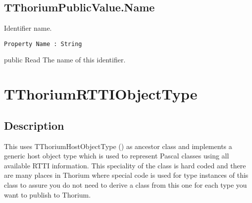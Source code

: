 \subsection{TThoriumPublicValue.Name}
\label{thoriumcorepkg:thorium:tthoriumpublicvalue:name}
\begin{FPCList}
\Synopsis
Identifier name.\Declaration 

\begin{verbatim}
Property Name : String
\end{verbatim}
\Visibility
public
\Access
Read
\Description
The name of this identifier.\end{FPCList}
\section{TThoriumRTTIObjectType}
\label{thoriumcorepkg:thorium:tthoriumrttiobjecttype}
\subsection{Description}
This uses TThoriumHostObjectType (\pageref{thoriumcorepkg:thorium:tthoriumhostobjecttype}) as ancestor class and implements a generic host object type which is used to represent Pascal classes using all available RTTI information. This speciality of the class is hard coded and there are many places in Thorium where special code is used for type instances of this class to assure you do not need to derive a class from this one for each type you want to publish to Thorium.%
